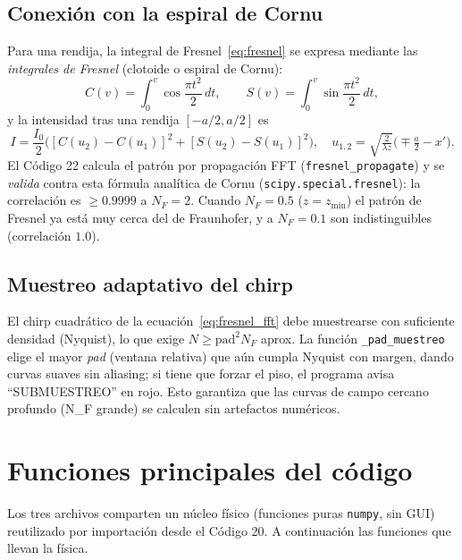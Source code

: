 \documentclass[11pt,a4paper]{article}
\begin{document}
\subsection{Conexión con la espiral de Cornu}
Para una rendija, la integral de Fresnel~\eqref{eq:fresnel} se expresa mediante las
\emph{integrales de Fresnel} (clotoide o espiral de Cornu):
\begin{equation}
C(v)=\int_0^v\!\cos\!\frac{\pi t^2}{2}\,dt,\qquad
S(v)=\int_0^v\!\sin\!\frac{\pi t^2}{2}\,dt,
\end{equation}
y la intensidad tras una rendija $[-a/2,a/2]$ es
\begin{equation}
I=\frac{I_0}{2}\Big([C(u_2)-C(u_1)]^2+[S(u_2)-S(u_1)]^2\Big),\quad
u_{1,2}=\sqrt{\tfrac{2}{\lambda z}}\Big(\mp\tfrac{a}{2}-x'\Big).
\end{equation}
El Código 22 calcula el patrón por propagación FFT (\texttt{fresnel\_propagate})
y se \emph{valida} contra esta fórmula analítica de Cornu
(\texttt{scipy.special.fresnel}): la correlación es $\ge 0.9999$ a $N_F=2$. Cuando
$N_F=0.5$ ($z=z_\text{min}$) el patrón de Fresnel ya está muy cerca del de
Fraunhofer, y a $N_F=0.1$ son indistinguibles (correlación $1.0$).

\subsection{Muestreo adaptativo del chirp}
El chirp cuadrático de la ecuación~\eqref{eq:fresnel_fft} debe muestrearse con
suficiente densidad (Nyquist), lo que exige $N\ge \text{pad}^2 N_F$ aprox. La
función \texttt{\_pad\_muestreo} elige el mayor \emph{pad} (ventana relativa) que
aún cumpla Nyquist con margen, dando curvas suaves sin aliasing; si tiene que
forzar el piso, el programa avisa ``SUBMUESTREO'' en rojo. Esto garantiza que las
curvas de campo cercano profundo (N\_F grande) se calculen sin artefactos
numéricos.

\section{Funciones principales del código}

Los tres archivos comparten un núcleo físico (funciones puras \texttt{numpy}, sin
GUI) reutilizado por importación desde el Código 20. A continuación las funciones
que llevan la física.
\end{document}
